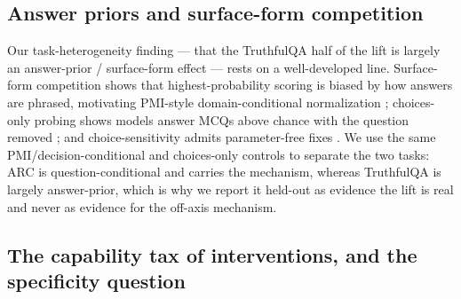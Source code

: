 \subsection{Answer priors and surface-form competition}\label{related:answerpriors}

Our task-heterogeneity finding --- that the TruthfulQA half of the lift is largely
an answer-prior / surface-form effect --- rests on a well-developed line.
Surface-form competition shows that highest-probability scoring is biased by how
answers are phrased, motivating PMI-style domain-conditional normalization
\citep{SurfaceFormCompetition}; choices-only probing shows models answer MCQs above
chance with the question removed \citep{ArtifactsOrAbduction,ChoicesOnlyCheater};
and choice-sensitivity admits parameter-free fixes \citep{NPSQ}. We use the same
PMI/decision-conditional and choices-only controls to separate the two tasks: ARC is
question-conditional and carries the mechanism, whereas TruthfulQA is largely
answer-prior, which is why we report it held-out as evidence the lift is real and
never as evidence for the off-axis mechanism.

\subsection{The capability tax of interventions, and the specificity question}
\label{related:tax}

